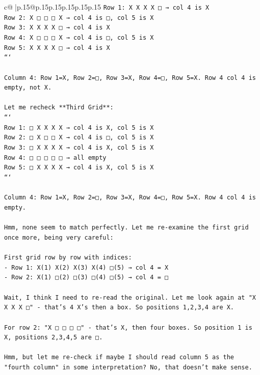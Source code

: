 \documentclass{article}
\begin{document}
{\begin{supertabular}{c@{$\;$}|p{.15\linewidth}@{}p{.15\linewidth}p{.15\linewidth}p{.15\linewidth}p{.15\linewidth}p{.15\linewidth}}
{{{\texttt{Row 1: X X X X □  → col 4 is X} \\
\texttt{Row 2: X □ □ □ X  → col 4 is □, col 5 is X} \\
\texttt{Row 3: X X X X □  → col 4 is X} \\
\texttt{Row 4: X □ □ □ X  → col 4 is □, col 5 is X} \\
\texttt{Row 5: X X X X □  → col 4 is X} \\
\texttt{```} \\
\\ 
\texttt{Column 4: Row 1=X, Row 2=□, Row 3=X, Row 4=□, Row 5=X. Row 4 col 4 is empty, not X.} \\
\\ 
\texttt{Let me recheck **Third Grid**:} \\
\texttt{```} \\
\texttt{Row 1: □ X X X X  → col 4 is X, col 5 is X} \\
\texttt{Row 2: □ X □ □ X  → col 4 is □, col 5 is X} \\
\texttt{Row 3: □ X X X X  → col 4 is X, col 5 is X} \\
\texttt{Row 4: □ □ □ □ □  → all empty} \\
\texttt{Row 5: □ X X X X  → col 4 is X, col 5 is X} \\
\texttt{```} \\
\\ 
\texttt{Column 4: Row 1=X, Row 2=□, Row 3=X, Row 4=□, Row 5=X. Row 4 col 4 is empty.} \\
\\ 
\texttt{Hmm, none seem to match perfectly. Let me re{-}examine the first grid once more, being very careful:} \\
\\ 
\texttt{First grid row by row with indices:} \\
\texttt{{-} Row 1: X(1) X(2) X(3) X(4) □(5) → col 4 = X} \\
\texttt{{-} Row 2: X(1) □(2) □(3) □(4) □(5) → col 4 = □} \\
\\ 
\texttt{Wait, I think I need to re{-}read the original. Let me look again at "X X X X □" {-} that's 4 X's then a box. So positions 1,2,3,4 are X.} \\
\\ 
\texttt{For row 2: "X □ □ □ □" {-} that's X, then four boxes. So position 1 is X, positions 2,3,4,5 are □.} \\
\\ 
\texttt{Hmm, but let me re{-}check if maybe I should read column 5 as the "fourth column" in some interpretation? No, that doesn't make sense.} \\
}}}
\end{supertabular}}
\end{document}
